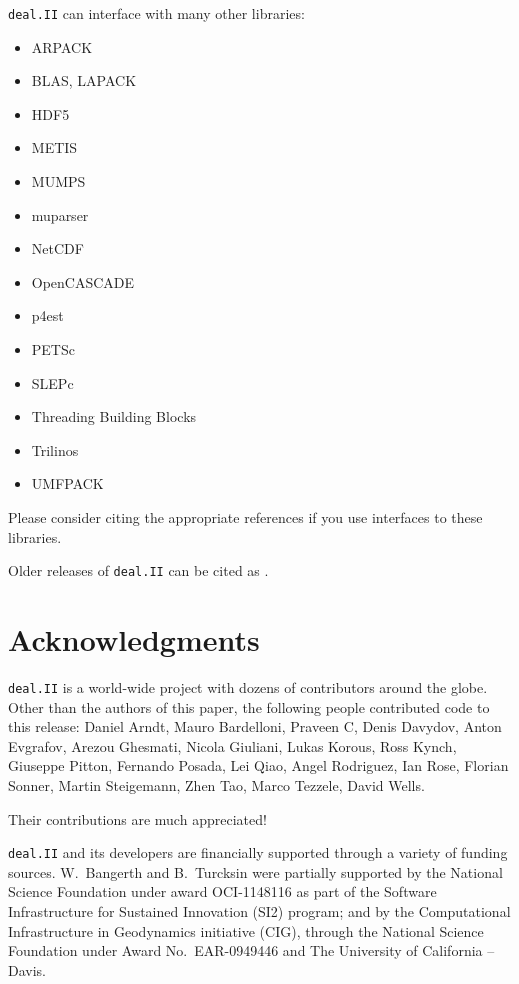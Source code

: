 \documentclass{ansarticle-preprint}
\newcommand{\specialword}[1]{\texttt{#1}}
\newcommand{\dealii}{{\specialword{deal.II}}}
\begin{document}
\dealii{} can interface with many other libraries:
\begin{itemize}
\item ARPACK \cite{arpack}
\item BLAS, LAPACK
\item HDF5 \cite{hdf5}
\item METIS \cite{karypis1998fast}
\item MUMPS \cite{ADE00,MUMPS:1,MUMPS:2,mumps-web-page}
\item muparser \cite{muparser-web-page}
\item NetCDF \cite{rew1990netcdf}
\item OpenCASCADE \cite{opencascade-web-page}
\item p4est \cite{p4est}
\item PETSc \cite{petsc-user-ref,petsc-web-page}
\item SLEPc \cite{Hernandez:2005:SSF}
\item Threading Building Blocks \cite{Rei07}
\item Trilinos \cite{trilinos,trilinos-web-page}
\item UMFPACK \cite{umfpack}
\end{itemize}
Please consider citing the appropriate references if you use interfaces to these
libraries.

Older releases of \dealii{} can be cited as \cite{dealII80,dealII81,dealII82}.

\nocite{BangerthKanschat1999}

\section{Acknowledgments}

\dealii{} is a world-wide project with dozens of contributors around the
globe. Other than the authors of this paper, the following people contributed code to
this release:
%
%
Daniel Arndt,
Mauro Bardelloni,
Praveen C,
Denis Davydov,
Anton Evgrafov,
Arezou Ghesmati,
Nicola Giuliani,
Lukas Korous,
Ross Kynch,
Giuseppe Pitton,
Fernando Posada,
Lei Qiao,
Angel Rodriguez,
Ian Rose,
Florian Sonner,
Martin Steigemann,
Zhen Tao,
Marco Tezzele,
David Wells.

Their contributions are much appreciated!


\dealii{} and its developers are financially supported through a
variety of funding sources. W.~Bangerth and B.~Turcksin were partially
supported by the National Science Foundation under award OCI-1148116
as part of the Software Infrastructure for Sustained Innovation (SI2)
program; and by the Computational Infrastructure in Geodynamics initiative
(CIG), through the National Science Foundation under Award
No.~EAR-0949446 and The University of California -- Davis.
\end{document}
